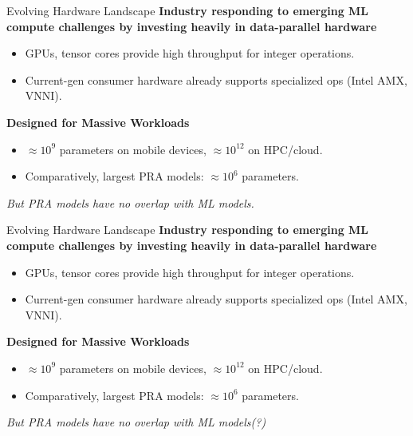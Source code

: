 \begin{frame}[t]{Evolving Hardware Landscape}
\textbf{Industry responding to emerging ML compute challenges by investing heavily in data-parallel hardware}
  \begin{itemize} 
    \item GPUs, tensor cores provide high throughput for integer operations.
    \item Current-gen consumer hardware already supports specialized ops (Intel AMX, VNNI).
  \end{itemize}
  \vspace{8pt}
\textbf{Designed for Massive Workloads}
  \begin{itemize} 
    \item $\approx10^9$ parameters on mobile devices, $\approx10^{12}$ on HPC/cloud.
    \item Comparatively, largest PRA models: $\approx10^6$ parameters.
  \end{itemize}
      \vspace{12pt}
  \textit{But PRA models have no overlap with ML models.}\\
\end{frame}

\begin{frame}[t]{Evolving Hardware Landscape}
\textbf{Industry responding to emerging ML compute challenges by investing heavily in data-parallel hardware}
  \begin{itemize} 
    \item GPUs, tensor cores provide high throughput for integer operations.
    \item Current-gen consumer hardware already supports specialized ops (Intel AMX, VNNI).
  \end{itemize}
  \vspace{8pt}
\textbf{Designed for Massive Workloads}
  \begin{itemize} 
    \item $\approx10^9$ parameters on mobile devices, $\approx10^{12}$ on HPC/cloud.
    \item Comparatively, largest PRA models: $\approx10^6$ parameters.
  \end{itemize}
      \vspace{12pt}
  \textit{But PRA models have no overlap with ML models(?)}\\
\end{frame}

